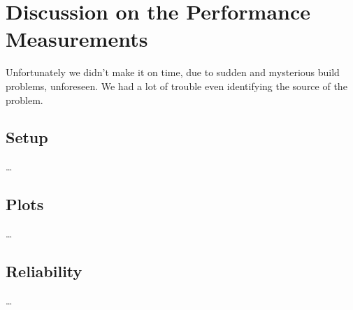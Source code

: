 
\section{Discussion on the Performance Measurements}

Unfortunately we didn't make it on time, due to sudden and mysterious build
problems, unforeseen. We had a lot of trouble even identifying the source of the
problem.

\subsection{Setup}
\dots

\subsection{Plots}
\dots

\subsection{Reliability}
\dots
